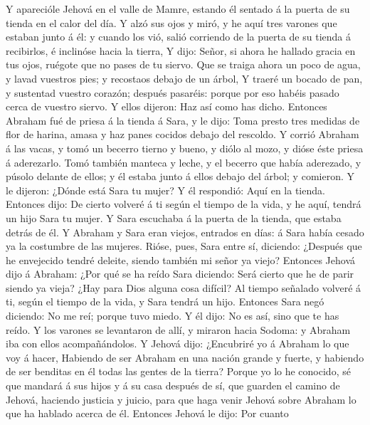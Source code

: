  Y aparecióle Jehová en el valle de Mamre, estando él
sentado á la puerta de su tienda en el calor del día.  Y
alzó sus ojos y miró, y he aquí tres varones que estaban junto á él: y
cuando los vió, salió corriendo de la puerta de su tienda á recibirlos,
é inclinóse hacia la tierra,  Y dijo: Señor, si ahora he
hallado gracia en tus ojos, ruégote que no pases de tu siervo.
 Que se traiga ahora un poco de agua, y lavad vuestros pies;
y recostaos debajo de un árbol,  Y traeré un bocado de pan,
y sustentad vuestro corazón; después pasaréis: porque por eso habéis
pasado cerca de vuestro siervo. Y ellos dijeron: Haz así como has dicho.
 Entonces Abraham fué de priesa á la tienda á Sara, y le
dijo: Toma presto tres medidas de flor de harina, amasa y haz panes
cocidos debajo del rescoldo.  Y corrió Abraham á las vacas,
y tomó un becerro tierno y bueno, y diólo al mozo, y dióse éste priesa á
aderezarlo.  Tomó también manteca y leche, y el becerro que
había aderezado, y púsolo delante de ellos; y él estaba junto á ellos
debajo del árbol; y comieron.  Y le dijeron: ¿Dónde está
Sara tu mujer? Y él respondió: Aquí en la tienda.  Entonces
dijo: De cierto volveré á ti según el tiempo de la vida, y he aquí,
tendrá un hijo Sara tu mujer. Y Sara escuchaba á la puerta de la tienda,
que estaba detrás de él.  Y Abraham y Sara eran viejos,
entrados en días: á Sara había cesado ya la costumbre de las mujeres.
 Rióse, pues, Sara entre sí, diciendo: ¿Después que he
envejecido tendré deleite, siendo también mi señor ya viejo?
 Entonces Jehová dijo á Abraham: ¿Por qué se ha reído Sara
diciendo: Será cierto que he de parir siendo ya vieja? 
¿Hay para Dios alguna cosa difícil? Al tiempo señalado volveré á ti,
según el tiempo de la vida, y Sara tendrá un hijo. 
Entonces Sara negó diciendo: No me reí; porque tuvo miedo. Y él dijo: No
es así, sino que te has reído.  Y los varones se levantaron
de allí, y miraron hacia Sodoma: y Abraham iba con ellos acompañándolos.
 Y Jehová dijo: ¿Encubriré yo á Abraham lo que voy á hacer,
 Habiendo de ser Abraham en una nación grande y fuerte, y
habiendo de ser benditas en él todas las gentes de la tierra?
 Porque yo lo he conocido, sé que mandará á sus hijos y á
su casa después de sí, que guarden el camino de Jehová, haciendo
justicia y juicio, para que haga venir Jehová sobre Abraham lo que ha
hablado acerca de él.  Entonces Jehová le dijo: Por cuanto
